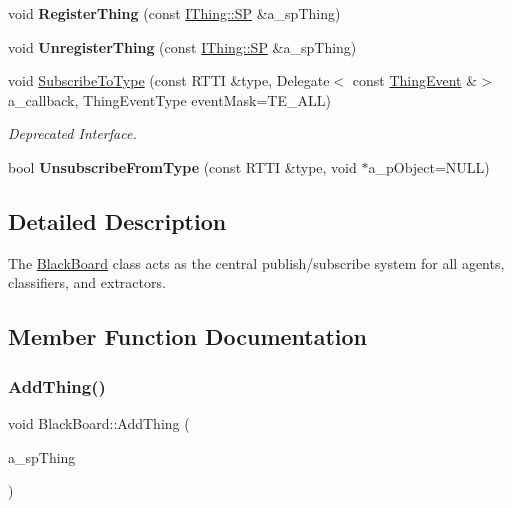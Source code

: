 \begin{DoxyCompactItemize}
\item 
\mbox{\label{class_black_board_a497c4e96a9fe9b38c003c69804af039f}} 
void {\bfseries Register\+Thing} (const \hyperlink{class_i_thing_a6e95654aef6362c48b9a2fd44a1f970a}{I\+Thing\+::\+SP} \&a\+\_\+sp\+Thing)
\item 
\mbox{\label{class_black_board_a031276d932dff376433465ce51930d0a}} 
void {\bfseries Unregister\+Thing} (const \hyperlink{class_i_thing_a6e95654aef6362c48b9a2fd44a1f970a}{I\+Thing\+::\+SP} \&a\+\_\+sp\+Thing)
\item 
\mbox{\label{class_black_board_aa4d9fbeac301adf593f08db2b6e24b74}} 
void \hyperlink{class_black_board_aa4d9fbeac301adf593f08db2b6e24b74}{Subscribe\+To\+Type} (const R\+T\+TI \&type, Delegate$<$ const \hyperlink{class_thing_event}{Thing\+Event} \&$>$ a\+\_\+callback, Thing\+Event\+Type event\+Mask=T\+E\+\_\+\+A\+LL)
\begin{DoxyCompactList}\small\item\em Deprecated Interface. \end{DoxyCompactList}\item 
\mbox{\label{class_black_board_a44f2cc7495a0a89e50813f5420ced0e5}} 
bool {\bfseries Unsubscribe\+From\+Type} (const R\+T\+TI \&type, void $\ast$a\+\_\+p\+Object=N\+U\+LL)
\end{DoxyCompactItemize}


\subsection{Detailed Description}
The \hyperlink{class_black_board}{Black\+Board} class acts as the central publish/subscribe system for all agents, classifiers, and extractors. 

\subsection{Member Function Documentation}
\mbox{\label{class_black_board_ae5c15e743e9abd413c1711a3091b6da8}} 
\subsubsection{\texorpdfstring{Add\+Thing()}{AddThing()}}
{\footnotesize\ttfamily void Black\+Board\+::\+Add\+Thing (\begin{DoxyParamCaption}\item[{const \hyperlink{class_i_thing_a6e95654aef6362c48b9a2fd44a1f970a}{I\+Thing\+::\+SP} \&}]{a\+\_\+sp\+Thing }\end{DoxyParamCaption})}

